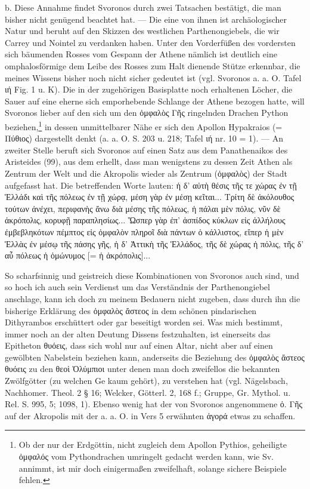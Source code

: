 \documentclass[a4paper, 11pt, oneside]{article}
\begin{document}
b. Diese Annahme findet Svoronos durch zwei Tatsachen bestätigt, die man bisher nicht genügend beachtet hat. --- Die eine von ihnen ist archäologischer Natur und beruht auf den Skizzen des westlichen Parthenongiebels, die wir Carrey und Nointel zu verdanken haben. Unter den Vorderfüßen des vordersten sich bäumenden Rosses vom Gespann der Athene nämlich ist deutlich eine omphalosförmige dem Leibe des Rosses zum Halt dienende Stütze erkennbar, die meines Wissens bisher noch nicht sicher gedeutet ist (vgl. Svoronos a. a. O. Tafel ιή Fig. 1 u. K). Die in der zugehörigen Basisplatte noch erhaltenen Löcher, die Sauer auf eine eherne sich emporhebende Schlange der Athene bezogen hatte, will Svoronos lieber auf den sich um den ὀμφαλὸς Γῆς ringelnden Drachen Python beziehen,\footnote{Ob der nur der Erdgöttin, nicht zugleich dem Apollon Pythios, geheiligte ὀμφαλός vom Pythondrachen umringelt gedacht werden kann, wie Sv. annimmt, ist mir doch einigermaßen zweifelhaft, solange sichere Beispiele fehlen.} in dessen unmittelbarer Nähe er sich den Apollon Hypakraios (= Πύθιος) dargestellt denkt (a. a. O. S. 203 u. 218; Tafel ιή nr. 10 = 1). --- An zweiter Stelle beruft sich Svoronos auf einen Satz aus dem Panathenaikos des Aristeides (99), aus dem erhellt, dass man wenigstens zu dessen Zeit Athen als Zentrum der Welt und die Akropolis wieder als Zentrum (ὀμφαλὸς) der Stadt aufgefasst hat. Die betreffenden Worte lauten: ἡ δ' αὐτὴ θέσις τῆς τε χώρας ἐν τῇ Ἑλλάδι καὶ τῆς πόλεως ἐν τῇ χώρᾳ, μέση γὰρ ἐν μέσῃ κεῖται... Τρίτη δὲ ἀκόλουθος τούτων ἀνέχει, περιφανὴς ἄνω διὰ μέσης τῆς πόλεως, ἡ πάλαι μὲν πόλις, νῦν δὲ ἀκρόπολις, κορυφῇ παραπλησίως... Ὥσπερ γὰρ ἐπ' ἀσπίδος κύκλων εἰς ἀλλήλους ἐμβεβληκότων πέμπτος εἰς ὀμφαλὸν πληροῖ διὰ πάντων ὁ κάλλιστος, εἴπερ ἡ μὲν Ἑλλὰς ἐν μέσῳ τῆς πάσης γῆς, ἡ δ' Ἀττικὴ τῆς Ἑλλάδος, τῆς δὲ χώρας ἡ πόλις, τῆς δ' αὖ πόλεως ἡ ὁμώνυμος [= ἡ ἀκρόπολις]...

So scharfsinnig und geistreich diese Kombinationen von Svoronos auch sind, und so hoch ich auch sein Verdienst um das Verständnis der Parthenongiebel anschlage, kann ich doch zu meinem Bedauern nicht zugeben, dass durch ihn die bisherige Erklärung des ὀμφαλὸς ἄστεος in dem schönen pindarischen Dithyrambos erschüttert oder gar beseitigt worden sei. Was mich bestimmt, immer noch an der alten Deutung Dissens festzuhalten, ist einerseits das Epitheton θυόεις, dass sich wohl nur auf einen Altar, nicht aber auf einen gewölbten Nabelstein beziehen kann, anderseits die Beziehung des ὀμφαλὸς ἄστεος θυόεις zu den θεοὶ Ὀλύμπιοι unter denen man doch zweifellos die bekannten Zwölfgötter (zu welchen Ge kaum gehört), zu verstehen hat (vgl. Nägelsbach, Nachhomer. Theol. 2 § 16; Welcker, Götterl. 2, 168 f.; Gruppe, Gr. Mythol. u. Rel. S. 995, 5; 1098, 1). Ebenso wenig hat der von Svoronos angenommene ὀ. Γῆς auf der Akropolis mit der a. a. O. in Vers 5 erwähnten ἀγορά etwas zu schaffen.
\end{document}
